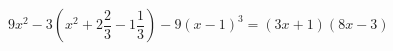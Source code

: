 \begin{ex}[type=equation]
	\begin{condition}
		$9x^2 - 3\left(x^2 +2\dfrac{2}{3}-1\dfrac{1}{3}\right) - 9(x - 1)^3 = (3x  + 1)(8x - 3)$
	\end{condition}
\end{ex}